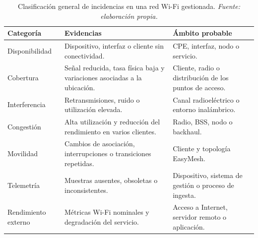 \begin{table}[H]
    \centering
    \small
    \renewcommand{\arraystretch}{1.35}

    \caption[Clasificación general de incidencias operativas.]
    {Clasificación general de incidencias en una red Wi-Fi gestionada.
    \textit{Fuente: elaboración propia.}}

    \label{tab:clasificacion-incidencias-operativas}

    \begin{tabular}{
        p{}
        p{}
        p{}
    }
        \hline

        \textbf{Categoría}
        &
        \textbf{Evidencias}
        &
        \textbf{Ámbito probable}
        \\

        \hline

        Disponibilidad
        &
        Dispositivo, interfaz o cliente sin conectividad.
        &
        CPE, interfaz, nodo o servicio.
        \\

        Cobertura
        &
        Señal reducida, tasa física baja y variaciones asociadas a la
        ubicación.
        &
        Cliente, radio o distribución de los puntos de acceso.
        \\

        Interferencia
        &
        Retransmisiones, ruido o utilización elevada.
        &
        Canal radioeléctrico o entorno inalámbrico.
        \\

        Congestión
        &
        Alta utilización y reducción del rendimiento en varios clientes.
        &
        Radio, BSS, nodo o backhaul.
        \\

        Movilidad
        &
        Cambios de asociación, interrupciones o transiciones repetidas.
        &
        Cliente y topología EasyMesh.
        \\

        Telemetría
        &
        Muestras ausentes, obsoletas o inconsistentes.
        &
        Dispositivo, sistema de gestión o proceso de ingesta.
        \\

        Rendimiento externo
        &
        Métricas Wi-Fi nominales y degradación del servicio.
        &
        Acceso a Internet, servidor remoto o aplicación.
        \\

        \hline
    \end{tabular}
\end{table}


